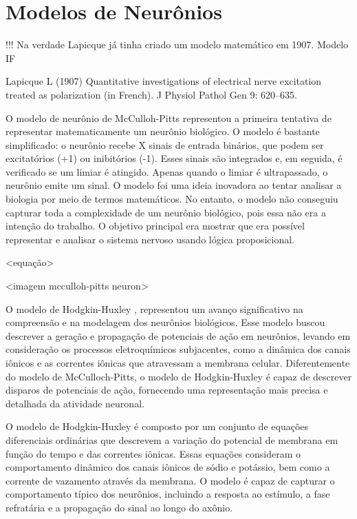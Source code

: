 \section{Modelos de Neurônios}

!!! Na verdade Lapicque já tinha criado um modelo matemático em 1907. Modelo IF

Lapicque L (1907) Quantitative investigations of electrical
nerve excitation treated as polarization (in French). J
Physiol Pathol Gen 9: 620–635.

O modelo de neurônio de McCulloh-Pitts \cite{mccullochLogical1943} representou a primeira tentativa de representar matematicamente
um neurônio biológico. O modelo é bastante simplificado: o neurônio recebe X sinais de entrada binários, que podem ser
excitatórios (+1) ou inibitórios (-1). Esses sinais são integrados e, em seguida, é verificado se um limiar é atingido. Apenas
quando o limiar é ultrapassado, o neurônio emite um sinal. O modelo foi uma ideia inovadora ao tentar analisar a biologia por meio
de termos matemáticos. No entanto, o modelo não conseguiu capturar toda a complexidade de um neurônio biológico, pois essa não era
a intenção do trabalho. O objetivo principal era mostrar que era possível representar e analisar o sistema nervoso usando lógica
proposicional.

<equação>

<imagem mcculloh-pitts neuron>

O modelo de Hodgkin-Huxley \cite{hodgkinQuantitative1952}, representou um avanço significativo na compreensão e na modelagem dos
neurônios biológicos. Esse modelo buscou descrever a geração e propagação de potenciais de ação em neurônios, levando em
consideração os processos eletroquímicos subjacentes, como a dinâmica dos canais iônicos e as correntes iônicas que atravessam a
membrana celular. Diferentemente do modelo de McCulloch-Pitts, o modelo de Hodgkin-Huxley é capaz de descrever disparos de
potenciais de ação, fornecendo uma representação mais precisa e detalhada da atividade neuronal.

O modelo de Hodgkin-Huxley é composto por um conjunto de equações diferenciais ordinárias que descrevem a variação do potencial de
membrana em função do tempo e das correntes iônicas. Essas equações consideram o comportamento dinâmico dos canais iônicos de
sódio e potássio, bem como a corrente de vazamento através da membrana. O modelo é capaz de capturar o comportamento típico dos
neurônios, incluindo a resposta ao estímulo, a fase refratária e a propagação do sinal ao longo do axônio.

